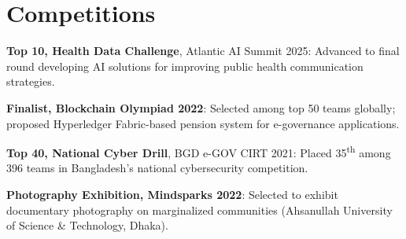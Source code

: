 \documentclass[letterpaper,11pt]{article}
\begin{document}
  
\section{Competitions}
  \begin{itemize}[leftmargin=0.15in, label={--}, nosep]
    \small{
      \item {
        \textbf{Top 10, Health Data Challenge}, Atlantic AI Summit 2025: Advanced to final round developing AI solutions for improving public health communication strategies.
      }
      \item {
        \textbf{Finalist, Blockchain Olympiad 2022}: Selected among top 50 teams globally; proposed Hyperledger Fabric-based pension system for e-governance applications.
      }
      \item {
        \textbf{Top 40, National Cyber Drill}, BGD e-GOV CIRT 2021: Placed 35\textsuperscript{th} among 396 teams in Bangladesh's national cybersecurity competition.
      }
      \item {
        \textbf{Photography Exhibition, Mindsparks 2022}: Selected to exhibit documentary photography on marginalized communities (Ahsanullah University of Science \& Technology, Dhaka).
      }
    }
  \end{itemize}
  
\end{document}
